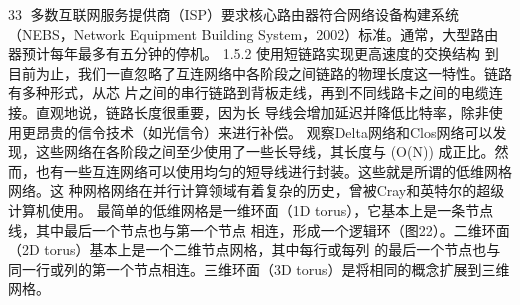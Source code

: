                                                     33
多数互联网服务提供商（ISP）要求核心路由器符合网络设备构建系统（NEBS，Network Equipment
Building System，2002）标准。通常，大型路由器预计每年最多有五分钟的停机。
1.5.2 使用短链路实现更高速度的交换结构
到目前为止，我们一直忽略了互连网络中各阶段之间链路的物理长度这一特性。链路有多种形式，从芯
片之间的串行链路到背板走线，再到不同线路卡之间的电缆连接。直观地说，链路长度很重要，因为长
导线会增加延迟并降低比特率，除非使用更昂贵的信令技术（如光信令）来进行补偿。
观察Delta网络和Clos网络可以发现，这些网络在各阶段之间至少使用了一些长导线，其长度与 (O(N))
成正比。然而，也有一些互连网络可以使用均匀的短导线进行封装。这些就是所谓的低维网格网络。这
种网格网络在并行计算领域有着复杂的历史，曾被Cray和英特尔的超级计算机使用。
最简单的低维网格是一维环面（1D torus），它基本上是一条节点线，其中最后一个节点也与第一个节点
相连，形成一个逻辑环（图22）。二维环面（2D torus）基本上是一个二维节点网格，其中每行或每列
的最后一个节点也与同一行或列的第一个节点相连。三维环面（3D torus）是将相同的概念扩展到三维
网格。




